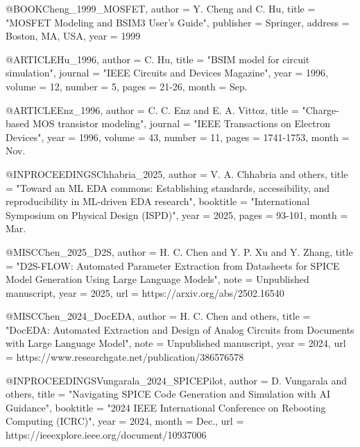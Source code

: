 \documentclass[conference]{IEEEtran}
\begin{document}
@BOOK{Cheng_1999_MOSFET,
    author      =   {Y. {Cheng} and C. {Hu}},
    title       =   "{MOSFET Modeling and {BSIM3} User's Guide}",
    publisher   =   {Springer},
    address     =   {Boston, MA, USA},
    year        =   {1999}
}

@ARTICLE{Hu_1996,
    author      =   {C. {Hu}},
    title       =   "{BSIM model for circuit simulation}",
    journal     =   "{IEEE Circuits and Devices Magazine}",
    year        =   {1996},
    volume      =   {12},
    number      =   {5},
    pages       =   {21-26},
    month       =   {Sep.}
}

@ARTICLE{Enz_1996,
    author      =   {C. C. {Enz} and E. A. {Vittoz}},
    title       =   "{Charge-based {MOS} transistor modeling}",
    journal     =   "{IEEE Transactions on Electron Devices}",
    year        =   {1996},
    volume      =   {43},
    number      =   {11},
    pages       =   {1741-1753},
    month       =   {Nov.}
}


@INPROCEEDINGS{Chhabria_2025,
    author      =   {V. A. {Chhabria} and others},
    title       =   "{Toward an {ML} {EDA} commons: Establishing standards, accessibility, and reproducibility in {ML}-driven {EDA} research}",
    booktitle   =   "{International Symposium on Physical Design (ISPD)}",
    year        =   {2025},
    pages       =   {93-101},
    month       =   {Mar.}
}

@MISC{Chen_2025_D2S,
    author      =   {H. C. {Chen} and Y. P. {Xu} and Y. {Zhang}},
    title       =   "{D2S-FLOW: Automated Parameter Extraction from Datasheets for {SPICE} Model Generation Using Large Language Models}",
    note        =   {Unpublished manuscript},
    year        =   {2025},
    url         =   {https://arxiv.org/abs/2502.16540}
}

@MISC{Chen_2024_DocEDA,
    author      =   {H. C. {Chen} and others},
    title       =   "{DocEDA: Automated Extraction and Design of Analog Circuits from Documents with Large Language Model}",
    note        =   {Unpublished manuscript},
    year        =   {2024},
    url         =   {https://www.researchgate.net/publication/386576578}
}

@INPROCEEDINGS{Vungarala_2024_SPICEPilot,
    author      =   {D. {Vungarala} and others},
    title       =   "{Navigating {SPICE} Code Generation and Simulation with {AI} Guidance}",
    booktitle   =   "{2024 IEEE International Conference on Rebooting Computing (ICRC)}",
    year        =   {2024},
    month       =   {Dec.},
    url         =   {https://ieeexplore.ieee.org/document/10937006}
}
\end{document}
